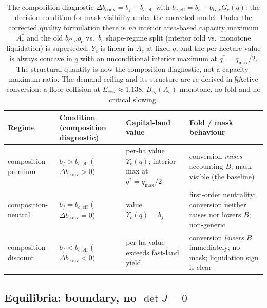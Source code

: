 \documentclass[11pt]{article}
\begin{document}
\begin{table}[htbp]
\centering
\small
\begin{tabularx}{\textwidth}{>{\raggedright\arraybackslash}X>{\raggedright\arraybackslash}X>{\raggedright\arraybackslash}X>{\raggedright\arraybackslash}X}
\toprule
Regime & Condition (composition diagnostic) & Capital-land value & Fold / mask behaviour \\
\midrule
composition-premium & $b_f>b_{c,\mathrm{eff}}$ ($\Delta b_{\mathrm{conv}}>0$) & per-ha value $\Upsilon_c(q)$; interior max at $q^*=q_{\max}/2$ & conversion \emph{raises} accounting $B$; mask visible (the baseline) \\
composition-neutral & $b_f=b_{c,\mathrm{eff}}$ ($\Delta b_{\mathrm{conv}}=0$) & value $\Upsilon_c(q)=b_f$ & first-order neutrality; conversion neither raises nor lowers $B$; non-generic \\
composition-discount & $b_f<b_{c,\mathrm{eff}}$ ($\Delta b_{\mathrm{conv}}<0$) & per-ha value exceeds fast-land yield & conversion \emph{lowers} $B$ immediately; no mask; liquidation sign is clear \\
\bottomrule
\end{tabularx}
\caption{The composition diagnostic $\Delta b_{\mathrm{conv}}=b_f-b_{c,\mathrm{eff}}$ with
$b_{c,\mathrm{eff}}=b_c+b_{G,c}G_c(q)$: the decision condition for mask visibility under the corrected model.
Under the corrected quality formulation there is \emph{no} interior area-based capacity maximum
$A_c^*$ and the old $b_{G,c}\rho_c$ vs.\ $b_c$ shape-regime split (interior fold vs.\ monotone liquidation) is
superseded: $Y_c$ is linear in $A_c$ at fixed $q$, and the per-hectare value is always concave in $q$ with an
unconditional interior maximum at $q^*=q_{\max}/2$. The structural quantity is now the composition diagnostic, not a
capacity-maximum ratio. The demand ceiling and its structure are re-derived in \S Active conversion: a floor collision at $E_{ceil}\approx1.138$, $B_{eq}(A_c)$ monotone, no fold and no critical slowing.}
\label{tab:regime}
\end{table}

\subsection{Equilibria: boundary, no $\det J\equiv0$}
\end{document}
